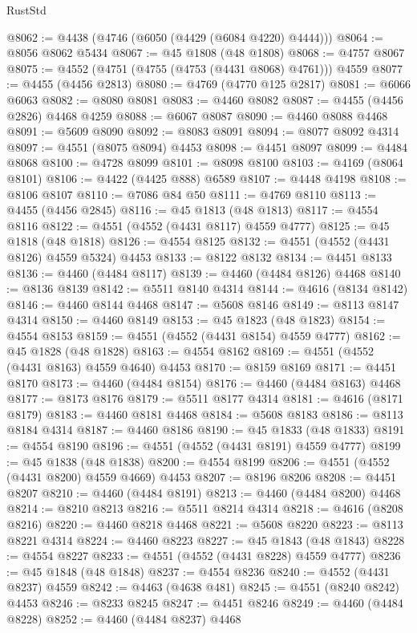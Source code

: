 \begin{lexlean}{RustStd}
\begin{coremodule}
@8062 := @4438 (@4746 (@6050 (@4429 (@6084 @4220) @4444)))
@8064 := @8056 @8062 @5434
@8067 := @45 @1808 (@48 @1808)
@8068 := @4757 @8067
@8075 := @4552 (@4751 (@4755 (@4753 (@4431 @8068) @4761))) @4559
@8077 := @4455 (@4456 @2813)
@8080 := @4769 (@4770 @125 @2817)
@8081 := @6066 @6063
@8082 := @8080 @8081
@8083 := @4460 @8082
@8087 := @4455 (@4456 @2826) @4468 @4259
@8088 := @6067 @8087
@8090 := @4460 @8088 @4468
@8091 := @5609 @8090
@8092 := @8083 @8091
@8094 := @8077 @8092 @4314
@8097 := @4551 (@8075 @8094) @4453
@8098 := @4451 @8097
@8099 := @4484 @8068
@8100 := @4728 @8099
@8101 := @8098 @8100
@8103 := @4169 (@8064 @8101)
@8106 := @4422 (@4425 @888) @6589
@8107 := @4448 @4198
@8108 := @8106 @8107
@8110 := @7086 @84 @50
@8111 := @4769 @8110
@8113 := @4455 (@4456 @2845)
@8116 := @45 @1813 (@48 @1813)
@8117 := @4554 @8116
@8122 := @4551 (@4552 (@4431 @8117) @4559 @4777)
@8125 := @45 @1818 (@48 @1818)
@8126 := @4554 @8125
@8132 := @4551 (@4552 (@4431 @8126) @4559 @5324) @4453
@8133 := @8122 @8132
@8134 := @4451 @8133
@8136 := @4460 (@4484 @8117)
@8139 := @4460 (@4484 @8126) @4468
@8140 := @8136 @8139
@8142 := @5511 @8140 @4314
@8144 := @4616 (@8134 @8142)
@8146 := @4460 @8144 @4468
@8147 := @5608 @8146
@8149 := @8113 @8147 @4314
@8150 := @4460 @8149
@8153 := @45 @1823 (@48 @1823)
@8154 := @4554 @8153
@8159 := @4551 (@4552 (@4431 @8154) @4559 @4777)
@8162 := @45 @1828 (@48 @1828)
@8163 := @4554 @8162
@8169 := @4551 (@4552 (@4431 @8163) @4559 @4640) @4453
@8170 := @8159 @8169
@8171 := @4451 @8170
@8173 := @4460 (@4484 @8154)
@8176 := @4460 (@4484 @8163) @4468
@8177 := @8173 @8176
@8179 := @5511 @8177 @4314
@8181 := @4616 (@8171 @8179)
@8183 := @4460 @8181 @4468
@8184 := @5608 @8183
@8186 := @8113 @8184 @4314
@8187 := @4460 @8186
@8190 := @45 @1833 (@48 @1833)
@8191 := @4554 @8190
@8196 := @4551 (@4552 (@4431 @8191) @4559 @4777)
@8199 := @45 @1838 (@48 @1838)
@8200 := @4554 @8199
@8206 := @4551 (@4552 (@4431 @8200) @4559 @4669) @4453
@8207 := @8196 @8206
@8208 := @4451 @8207
@8210 := @4460 (@4484 @8191)
@8213 := @4460 (@4484 @8200) @4468
@8214 := @8210 @8213
@8216 := @5511 @8214 @4314
@8218 := @4616 (@8208 @8216)
@8220 := @4460 @8218 @4468
@8221 := @5608 @8220
@8223 := @8113 @8221 @4314
@8224 := @4460 @8223
@8227 := @45 @1843 (@48 @1843)
@8228 := @4554 @8227
@8233 := @4551 (@4552 (@4431 @8228) @4559 @4777)
@8236 := @45 @1848 (@48 @1848)
@8237 := @4554 @8236
@8240 := @4552 (@4431 @8237) @4559
@8242 := @4463 (@4638 @481)
@8245 := @4551 (@8240 @8242) @4453
@8246 := @8233 @8245
@8247 := @4451 @8246
@8249 := @4460 (@4484 @8228)
@8252 := @4460 (@4484 @8237) @4468

\end{coremodule}
\end{lexlean}
